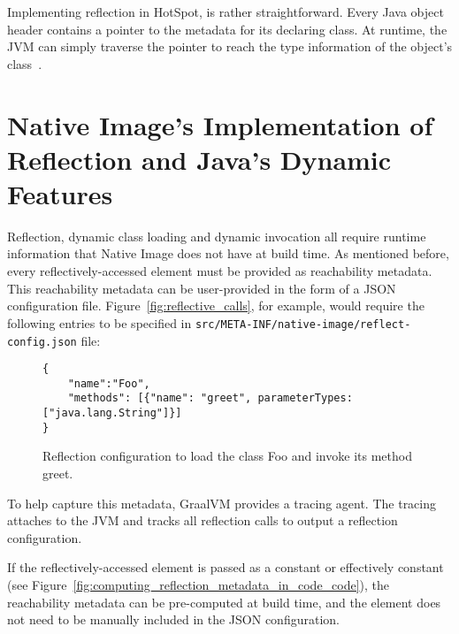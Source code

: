 Implementing reflection in HotSpot, is rather straightforward. Every Java object header contains a pointer to the metadata for its declaring class. At runtime, the JVM can simply traverse the pointer to reach the type information of the object's class~\cite{evans_ben_reflection_nodate}.



\section{Native Image's Implementation of Reflection and Java's Dynamic Features}
Reflection, dynamic class loading and dynamic invocation all require runtime information that Native Image does not have at build time.
As mentioned before, every reflectively-accessed element must be provided as reachability metadata.
This reachability metadata can be user-provided in the form of a JSON configuration file.  
Figure~\ref{fig:reflective_calls}, for example, would require the following entries to be specified in
\verb|src/META-INF/native-image/reflect-config.json| file:

\begin{figure}[ht]
    \centering
\begin{lstlisting}
{
    "name":"Foo",
    "methods": [{"name": "greet", parameterTypes: ["java.lang.String"]}]
}    
\end{lstlisting}
    \caption{Reflection configuration to load the class Foo and invoke its method greet.}
    \label{fig:reflect_config}
\end{figure}

To help capture this metadata, GraalVM provides a tracing agent. The tracing attaches to the JVM and tracks all reflection calls to output a reflection configuration.   

If the reflectively-accessed element is passed as a constant or effectively constant (see Figure~\ref{fig:computing_reflection_metadata_in_code_code}), the reachability metadata can be pre-computed at build time, and the element does not need to be manually included in the JSON configuration. 

